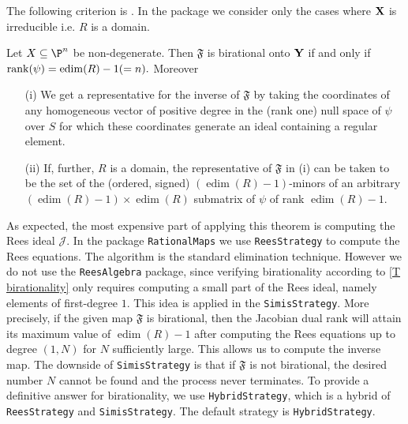 \documentclass[11pt]{amsart}
\numberwithin{equation}{theorem}
\def\XX{{\bf X}}
\def\YY{{\bf Y}}
\renewcommand{\:}{\colon}
\DeclareMathOperator{\edim}{edim}
\theoremstyle{theorem}
\begin{document}
\vspace{0.2in}
The  following  criterion is   \cite[Theorem 2.18 ]{DoriaHassanzadehSimisBirationality}. In the package we consider only the cases where $\XX$ is irreducible i.e. $R$ is a domain.
\begin{theorem} \label{T birationality}Let $X\subseteq \P^n$ be non-degenerate. Then $\mathfrak{F}$ is birational onto $\YY$  if and only if ${\rm rank}(\psi)=\edim(R)-1(=n).$
Moreover
\begin{enumerate}
  \item[{\rm (i)}] We get a representative for the inverse of $\mathfrak{F}$ by taking the coordinates of any homogeneous vector of positive degree
in the {\rm (}rank one{\rm )} null space of $\psi$ over $S$ for which these coordinates generate an ideal containing
a regular element.

\item[{\rm (ii)}] If, further, $R$ is a domain, the representative of $\mathfrak{F}$ in {\rm (i)}
can be taken to be the set of the {\rm (}ordered, signed{\rm )} $(\edim(R)-1)$-minors
of an arbitrary $(\edim(R)-1)\times \edim(R)$ submatrix of $\psi$ of rank $\edim(R)-1$.
\end{enumerate}

\end{theorem}

As expected, the most expensive part of applying this theorem is computing the Rees ideal ${\mathcal J}$. In the package {\tt RationalMaps} we use {\tt ReesStrategy} to compute the Rees equations. The algorithm is the standard elimination technique. However we do not use the {\tt ReesAlgebra} package, since verifying birationality according to \autoref{T birationality} only requires  computing a small part of the Rees ideal, namely elements of first-degree $1$. This idea is applied in the {\tt SimisStrategy}. More precisely, if the given map $\mathfrak{F}$ is birational, then the Jacobian dual rank will attain its maximum value of $\edim(R)-1$ after computing the Rees equations up to  degree $(1,N)$ for $N$ sufficiently large. This allows us to compute the inverse map.  The downside of {\tt SimisStrategy} is that if $\mathfrak{F}$ is not birational,  the desired number $N$ cannot be found and the process never terminates. To provide a definitive answer for birationality,  we use {\tt HybridStrategy}, which is a hybrid of {\tt ReesStrategy} and {\tt SimisStrategy}.  The default strategy is {\tt HybridStrategy}.
\end{document}
